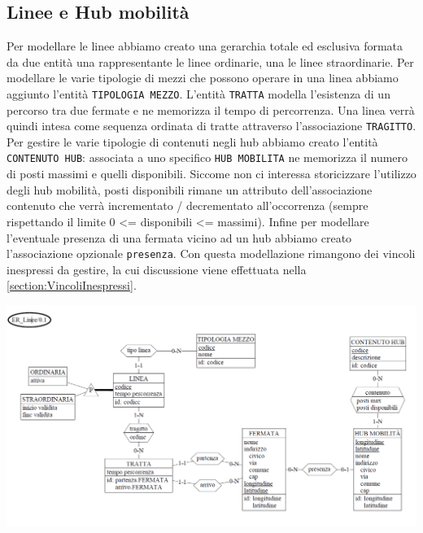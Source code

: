 \documentclass[12pt,a4paper]{report}
\begin{document}
\subsection{Linee e Hub mobilità}
Per modellare le linee abbiamo creato una gerarchia totale ed esclusiva formata da due entità una rappresentante le linee ordinarie, una le linee straordinarie. Per modellare le varie tipologie di mezzi che possono operare in una linea abbiamo aggiunto l'entità \texttt{TIPOLOGIA MEZZO}. L'entità \texttt{TRATTA} modella l'esistenza di un percorso tra due fermate e ne memorizza il tempo di percorrenza. Una linea verrà quindi intesa come sequenza ordinata di tratte attraverso l'associazione \texttt{TRAGITTO}. Per gestire le varie tipologie di contenuti negli hub abbiamo creato l'entità \texttt{CONTENUTO HUB}: associata a uno specifico \texttt{HUB MOBILITA} ne memorizza il numero di posti massimi e quelli disponibili. Siccome non ci interessa storicizzare l'utilizzo degli hub mobilità, posti disponibili rimane un attributo dell'associazione contenuto che verrà incrementato / decrementato all'occorrenza (sempre rispettando il limite 0  {\textless}= disponibili {\textless}= massimi). Infine per modellare l'eventuale presenza di una fermata vicino ad un hub abbiamo creato l'associazione opzionale \texttt{presenza}.
Con questa modellazione rimangono dei vincoli inespressi da gestire, la cui discussione viene effettuata nella \cref{section:VincoliInespressi}.\\
\begin{centering}
\includegraphics[width=1.0\textwidth]{prog_conc/Linee}
\end{centering}
\end{document}

